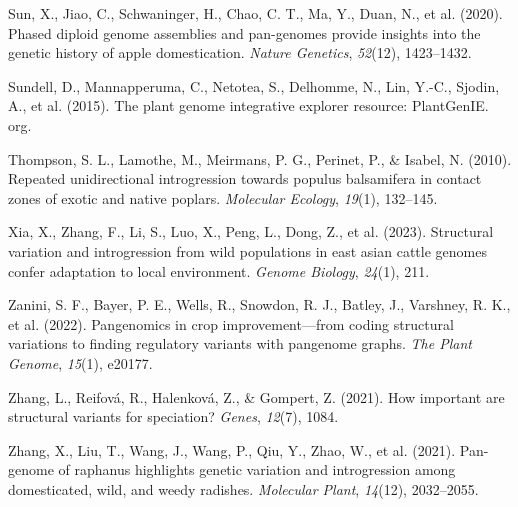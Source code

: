 \documentclass[
]{agujournal2019}
\newlength{\cslhangindent}
\newenvironment{CSLReferences}[2] %
 {\begin{list}{}{%
  \setlength{\itemindent}{0pt}
  \setlength{\leftmargin}{0pt}
  \setlength{\parsep}{0pt}
  \ifodd #1
   \setlength{\leftmargin}{\cslhangindent}
   \setlength{\itemindent}{-1\cslhangindent}
  \fi
  \setlength{\itemsep}{#2\baselineskip}}}
 {\end{list}}
\begin{document}
\begin{CSLReferences}{1}{0}
Sun, X., Jiao, C., Schwaninger, H., Chao, C. T., Ma, Y., Duan, N., et
al. (2020). Phased diploid genome assemblies and pan-genomes provide
insights into the genetic history of apple domestication. \emph{Nature
Genetics}, \emph{52}(12), 1423--1432.

Sundell, D., Mannapperuma, C., Netotea, S., Delhomme, N., Lin, Y.-C.,
Sjodin, A., et al. (2015). The plant genome integrative explorer
resource: PlantGenIE. org.

Thompson, S. L., Lamothe, M., Meirmans, P. G., Perinet, P., \& Isabel,
N. (2010). Repeated unidirectional introgression towards populus
balsamifera in contact zones of exotic and native poplars.
\emph{Molecular Ecology}, \emph{19}(1), 132--145.

Xia, X., Zhang, F., Li, S., Luo, X., Peng, L., Dong, Z., et al. (2023).
Structural variation and introgression from wild populations in east
asian cattle genomes confer adaptation to local environment.
\emph{Genome Biology}, \emph{24}(1), 211.

Zanini, S. F., Bayer, P. E., Wells, R., Snowdon, R. J., Batley, J.,
Varshney, R. K., et al. (2022). Pangenomics in crop improvement---from
coding structural variations to finding regulatory variants with
pangenome graphs. \emph{The Plant Genome}, \emph{15}(1), e20177.

Zhang, L., Reifová, R., Halenková, Z., \& Gompert, Z. (2021). How
important are structural variants for speciation? \emph{Genes},
\emph{12}(7), 1084.

Zhang, X., Liu, T., Wang, J., Wang, P., Qiu, Y., Zhao, W., et al.
(2021). Pan-genome of raphanus highlights genetic variation and
introgression among domesticated, wild, and weedy radishes.
\emph{Molecular Plant}, \emph{14}(12), 2032--2055.

\end{CSLReferences}
\end{document}
